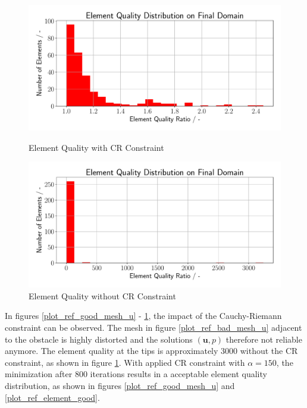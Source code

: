 \begin{figure}[h]
    \begin{minipage}{.5\textwidth}
        \centering
        \includegraphics[width=1\textwidth]{figures/element_quality_hist.pdf}
        \caption{Element Quality with CR Constraint}
        \label{plot_ref_element_good}
    \end{minipage}
    \begin{minipage}{.5\textwidth}
        \centering
        \includegraphics[width=1\textwidth]{figures/element_quality_hist_bad.pdf}
        \caption{Element Quality without CR Constraint}
        \label{plot_ref_element_bad}
    \end{minipage}
\end{figure}

In figures \ref{plot_ref_good_mesh_u} - \ref{plot_ref_element_bad}, the impact of the Cauchy-Riemann 
constraint can be observed. The mesh in figure \ref{plot_ref_bad_mesh_u} adjacent to the obstacle is
highly distorted and the solutions $(\mathbf{u},p)$ therefore not reliable anymore. The element quality 
at the tips is approximately 3000 without the CR constraint, as shown in figure \ref{plot_ref_element_bad}.
With applied CR constraint with $\alpha = 150$, the minimization after 800 iterations results in a acceptable
element quality distribution, as shown in figures \ref{plot_ref_good_mesh_u} and \ref{plot_ref_element_good}.

